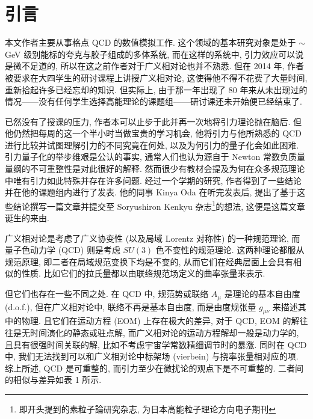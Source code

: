 \documentclass{article}
\begin{document}
\section{引言}
本文作者主要从事格点 QCD 的数值模拟工作. 这个领域的基本研究对象是处于 $\sim$GeV 级别能标的夸克与胶子组成的多体系统, 而在这样的系统中, 引力效应可以说是微不足道的, 所以在这之前作者对于广义相对论也并不熟悉. 但在 2014 年, 作者被要求在大四学生的研讨课程上讲授广义相对论, 这使得他不得不花费了大量时间, 重新拾起许多已经忘却的知识. 但实际上, 由于那一年出现了 80 年来从未出现过的情况——没有任何学生选择高能理论的课题组——研讨课还未开始便已经结束了.
\par
已然没有了授课的压力, 作者本可以止步于此并再一次地将引力理论抛在脑后. 但他仍然把每周的这一个半小时当做宝贵的学习机会, 他将引力与他所熟悉的 QCD 进行比较并试图理解引力的不同究竟在何处, 以及为何引力的量子化会如此困难. 引力量子化的举步维艰是公认的事实, 通常人们也认为源自于 Newton 常数负质量量纲的不可重整性是对此很好的解释. 然而很少有教材会提及为何在众多规范理论中唯有引力如此特殊并存在许多问题. 经过一个学期的研究, 作者得到了一些结论并在他的课题组内进行了发表. 他的同事 Kinya Oda 在听完发表后, 提出了基于这些结论撰写一篇文章并提交至 Soryushiron Kenkyu 杂志\footnote{即开头提到的素粒子論研究杂志, 为日本高能粒子理论方向电子期刊}的想法, 这便是这篇文章诞生的来由.
\par
广义相对论是考虑了广义协变性 (以及局域 Lorentz 对称性) 的一种规范理论, 而量子色动力学 (QCD) 则是考虑 $SU(3)$ 色不变性的规范理论. 这两种理论都服从规范原理, 即二者在局域规范变换下均是不变的, 从而它们在经典层面上会具有相似的性质. 比如它们的拉氏量都以由联络规范场定义的曲率张量来表示.
\par
但它们也存在一些不同之处. 在 QCD 中, 规范势或联络 $A_{\mu}$ 是理论的基本自由度 (d.o.f.), 但在广义相对论中, 联络不再是基本自由度, 而是由度规张量 $g_{\mu\nu}$ 来描述其中的物理. 且它们在运动方程 (EOM) 上存在极大的差异, 对于 QCD, EOM 的解往往是无时间演化的静态或驻点解, 而广义相对论的运动方程解却一般是动力学的, 且具有很强时间关联的解, 比如不考虑宇宙学常数精细调节时的暴涨. 同时在 QCD 中, 我们无法找到可以和广义相对论中标架场 (vierbein) 与挠率张量相对应的项. 综上所述, QCD 是可重整的, 而引力至少在微扰论的观点下是不可重整的. 二者间的相似与差异如表 1 所示.
\end{document}
